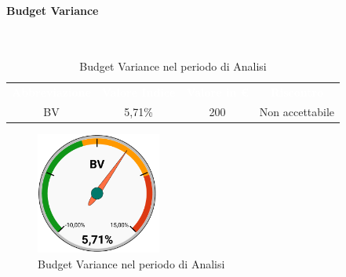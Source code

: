 \paragraph{Budget Variance}\mbox{}\\[0,3cm]
\begin{table}[H]
    \centering
    \begin{tabular}{cccc}
        \rowcolor{greySWEight}
        \textcolor{white}{\textbf{Abbreviazione}} &
        \textcolor{white}{\textbf{Valore Indice}}&
        \textcolor{white}{\textbf{Valore in €}}&
        \textcolor{white}{\textbf{Riscontro}}\\
        BV & 5,71\% & 200 & \textcolor{BrickRed}{Non accettabile}\\
    \end{tabular}
    \caption{Budget Variance nel periodo di Analisi}
\end{table}
\begin{figure}[H]
    \centering
	\includegraphics[height=4cm]{sez/App_Esito/graph/AN_BV.pdf}
	\caption{Budget Variance nel periodo di Analisi}
\end{figure}